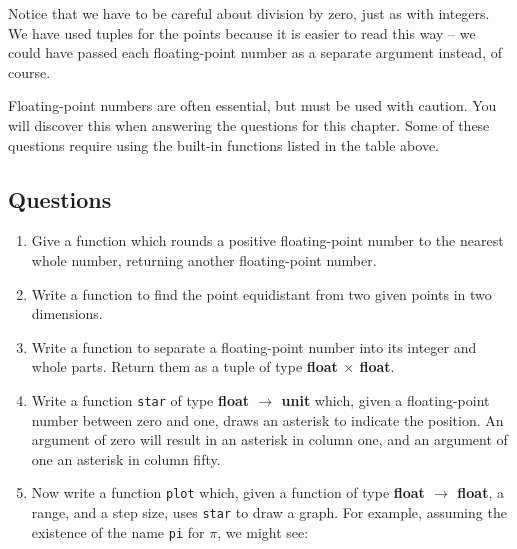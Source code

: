 \documentclass[]{book}
\begin{document}
\noindent Notice that we have to be careful about division by zero, just as with integers. We have used tuples for the points because it is easier to read this way -- we could have passed each floating-point number as a separate argument instead, of course.

Floating-point numbers are often essential, but must be used with caution. You will discover this when answering the questions for this chapter. Some of these questions require using the built-in functions listed in the table above.

\clearpage
\subsection*{Questions}
\begin{enumerate}
\item Give a function which rounds a positive floating-point number to the nearest whole number, returning another floating-point number.

\item Write a function to find the point equidistant from two given points in two dimensions.

\item Write a function to separate a floating-point number into its integer and whole parts. Return them as a tuple of type \textrm{\textbf{float $\times$ float}}.

\item Write a function \texttt{star} of type \textrm{\textbf{float $\rightarrow$ unit}} which, given a floating-point number between zero and one, draws an asterisk to indicate the position. An argument of zero will result in an asterisk in column one, and an argument of one an asterisk in column fifty.

\item Now write a function \texttt{plot} which, given a function of type \textrm{\textbf{float $\rightarrow$ float}}, a range, and a step size, uses \texttt{star} to draw a graph. For example, assuming the existence of the name \texttt{pi} for $\pi$, we might see:


\end{enumerate}
\end{document}
